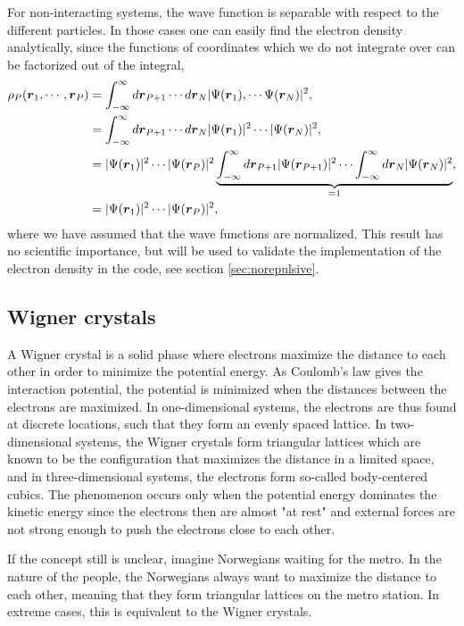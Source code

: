 For non-interacting systems, the wave function is separable with respect to the different particles. In those cases one can easily find the electron density analytically, since the functions of coordinates which we do not integrate over can be factorized out of the integral,
\begin{equation}
\begin{aligned}
\rho_P(\boldsymbol{{r}}_1,\cdots,\boldsymbol{{r}}_P)&=\int_{-\infty}^{\infty}d\boldsymbol{{r}}_{P+1}\cdots d\boldsymbol{{r}}_N |\Psi(\boldsymbol{{r}}_1),\cdots \Psi(\boldsymbol{{r}}_N)|^2,\\
&=\int_{-\infty}^{\infty}d\boldsymbol{{r}}_{P+1}\cdots d\boldsymbol{{r}}_N |\Psi(\boldsymbol{{r}}_1)|^2\cdots |\Psi(\boldsymbol{{r}}_N)|^2,\\
&=|\Psi(\boldsymbol{{r}}_1)|^2\cdots |\Psi(\boldsymbol{{r}}_P)|^2\underbrace{\int_{-\infty}^{\infty}d\boldsymbol{{r}}_{P+1}|\Psi(\boldsymbol{{r}}_{P+1})|^2\cdots\int_{-\infty}^{\infty}d\boldsymbol{{r}}_{N}|\Psi(\boldsymbol{{r}}_{N})|^2}_{=1},\\
&=|\Psi(\boldsymbol{{r}}_1)|^2\cdots |\Psi(\boldsymbol{{r}}_P)|^2,
\end{aligned}
\end{equation}
where we have assumed that the wave functions are normalized. This result has no scientific importance, but will be used to validate the implementation of the electron density in the code, see section \ref{sec:norepulsive}.

\subsection{Wigner crystals} \label{sec:wigner}
A Wigner crystal is a solid phase where electrons maximize the distance to each other in order to minimize the potential energy. As Coulomb's law gives the interaction potential, the potential is minimized when the distances between the electrons are maximized. In one-dimensional systems, the electrons are thus found at discrete locations, such that they form an evenly spaced lattice. In two-dimensional systems, the Wigner crystals form triangular lattices which are known to be the configuration that maximizes the distance in a limited space, and in three-dimensional systems, the electrons form so-called body-centered cubics. The phenomenon occurs only when the potential energy dominates the kinetic energy since the electrons then are almost "at rest" and external forces are not strong enough to push the electrons close to each other. 

If the concept still is unclear, imagine Norwegians waiting for the metro. In the nature of the people, the Norwegians always want to maximize the distance to each other, meaning that they form triangular lattices on the metro station. In extreme cases, this is equivalent to the Wigner crystals.


